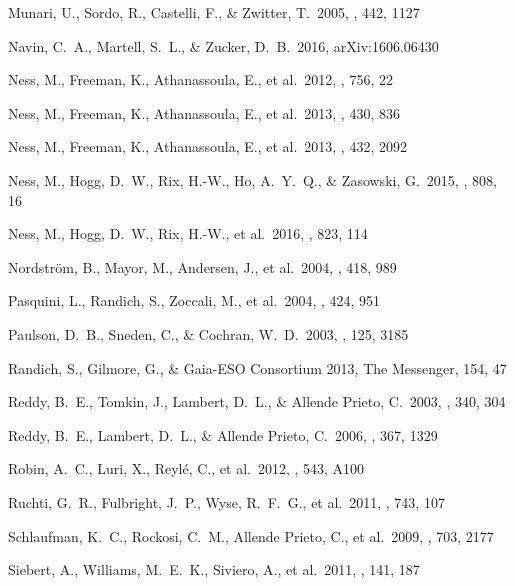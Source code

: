 \documentclass[preprint]{aastex}
\begin{document}
\begin{thebibliography}{dummy}
 Munari, U., Sordo, R., Castelli, F., \& Zwitter, T.\ 2005, \aap, 442, 1127 

 Navin, C.~A., Martell, S.~L., \& Zucker, D.~B.\ 2016, arXiv:1606.06430 

 Ness, M., Freeman, K., Athanassoula, E., et al.\ 2012, \apj, 756, 22 

 Ness, M., Freeman, K., Athanassoula, E., et al.\ 2013, \mnras, 430, 836 

 Ness, M., Freeman, K., Athanassoula, E., et al.\ 2013, \mnras, 432, 2092 

 Ness, M., Hogg, D.~W., Rix, H.-W., Ho, A.~Y.~Q., \& Zasowski, G.\ 2015, \apj, 808, 16 

 Ness, M., Hogg, D.~W., Rix, H.-W., et al.\ 2016, \apj, 823, 114 

 Nordstr{\"o}m, B., Mayor, M., Andersen, J., et al.\ 2004, \aap, 418, 989 

 Pasquini, L., Randich, S., Zoccali, M., et al.\ 2004, \aap, 424, 951 

 Paulson, D.~B., Sneden, C., \& Cochran, W.~D.\ 2003, \aj, 125, 3185 

 Randich, S., Gilmore, G., \& Gaia-ESO Consortium 2013, The Messenger, 154, 47 

 Reddy, B.~E., Tomkin, J., Lambert, D.~L., \& Allende Prieto, C.\ 2003, \mnras, 340, 304 

 Reddy, B.~E., Lambert, D.~L., \& Allende Prieto, C.\ 2006, \mnras, 367, 1329 

 Robin, A.~C., Luri, X., Reyl{\'e}, C., et al.\ 2012, \aap, 543, A100 

 Ruchti, G.~R., Fulbright, J.~P., Wyse, R.~F.~G., et al.\ 2011, \apj, 743, 107 

 Schlaufman, K.~C., Rockosi, C.~M., Allende Prieto, C., et al.\ 2009, \apj, 703, 2177 

 Siebert, A., Williams, M.~E.~K., Siviero, A., et al.\ 2011, \aj, 141, 187 


\end{thebibliography}
\end{document}
